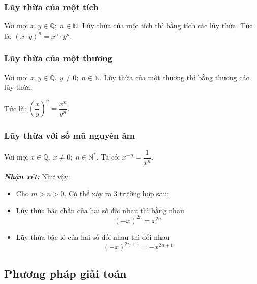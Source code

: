 \subsubsection{Lũy thừa của một tích}
Với mọi $x, y \in \mathbb{Q}; \; n \in \mathbb{N}$. Lũy thừa của một tích thì bằng tích các lũy thừa. Tức là: $\left( x\cdot y\right) ^n = x^n\cdot y^n$.
\subsubsection{Lũy thừa của một thương}
Với mọi $x, y \in \mathbb{Q}, \; y \ne 0; \; n \in \mathbb{N}$. Lũy thừa của một thương thì bằng thương các lũy thừa.

Tức là: $\left( \dfrac{x}{y}\right) ^n = \dfrac{x^n}{y^n}$.

\subsubsection{Lũy thừa với số mũ nguyên âm}
Với mọi $x \in \mathbb{Q}, \; x \ne 0; \; n \in \mathbb{N}^{*}$. Ta có: $x^{-n}= \dfrac{1}{x^n}$.
\begin{note}
	\textbf{\textit{Nhận xét:}} Như vậy:
	\begin{itemize}
		\item Cho $m > n >0$. Có thể xảy ra $3$ trường hợp sau:
		\item Lũy thừa bậc chẵn của hai số đối nhau thì bằng nhau
		\[ \left( -x\right) ^{2n} = x^{2n} \]
		\item Lũy thừa bậc lẻ của hai số đối nhau thì đối nhau
		\[ \left( -x\right) ^{2n+1} = -x^{2n+1} \]
	\end{itemize}
\end{note}

\subsection{Phương pháp giải toán}

